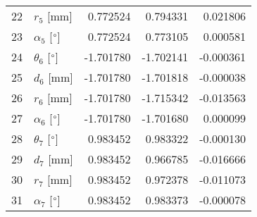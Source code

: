 \documentclass{standalone}%
\begin{document}
\begin{tabular}{llrrr}
22 &              $r_{5}$ [mm] &  0.772524 &   0.794331 &   0.021806 \\
23 &  $\alpha_{5}$ [$\degree$] &  0.772524 &   0.773105 &   0.000581 \\
24 &  $\theta_{6}$ [$\degree$] & -1.701780 &  -1.702141 &  -0.000361 \\
25 &              $d_{6}$ [mm] & -1.701780 &  -1.701818 &  -0.000038 \\
26 &              $r_{6}$ [mm] & -1.701780 &  -1.715342 &  -0.013563 \\
27 &  $\alpha_{6}$ [$\degree$] & -1.701780 &  -1.701680 &   0.000099 \\
28 &  $\theta_{7}$ [$\degree$] &  0.983452 &   0.983322 &  -0.000130 \\
29 &              $d_{7}$ [mm] &  0.983452 &   0.966785 &  -0.016666 \\
30 &              $r_{7}$ [mm] &  0.983452 &   0.972378 &  -0.011073 \\
31 &  $\alpha_{7}$ [$\degree$] &  0.983452 &   0.983373 &  -0.000078 \\
\bottomrule
\end{tabular}
%
\end{document}
